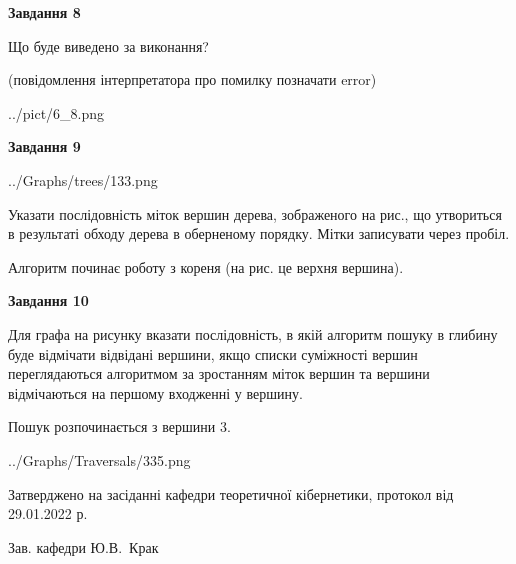 \documentclass[12pt, ukrainian]{article}
\begin{document}
{\begin {large}
{\begin {center}\textbf{Завдання 8}\end {center}}\par
Що буде виведено за виконання?\par
 (повідомлення інтерпретатора про помилку позначати error)\par
\begin{center}
	{../pict/6_8.png}
\end{center}
\newpage

{\begin {center}\textbf{Завдання 9}\end {center}}\par

\begin{center}
	{../Graphs/trees/133.png}
\end{center}
Указати послідовність міток вершин дерева, зображеного на рис., що утвориться в результаті обходу дерева в оберненому порядку. Мітки записувати через пробіл.\par Алгоритм починає роботу з кореня (на рис. це верхня вершина).\par
\newpage

{\begin {center}\textbf{Завдання 10}\end {center}}\par
Для графа на рисунку вказати послідовність, в якій алгоритм пошуку в глибину буде відмічати відвідані вершини, якщо списки суміжності вершин переглядаються алгоритмом за зростанням міток вершин та вершини відмічаються на першому вход\-женні у вершину.\par
Пошук розпочинається з вершини 3.\par

\begin{center}
	{../Graphs/Traversals/335.png}
\end{center}\par
\newpage


\end {large}
}
{\smallskip \begin {small} Затверджено на засіданні кафедри теоретичної кібернетики, протокол  від   29.01.2022 р.\par\smallskip\smallskip
{\parbox {6.5 cm}{Зав. кафедри \dotfill Ю.В.~Крак}} \end{small}}
\end{document}
